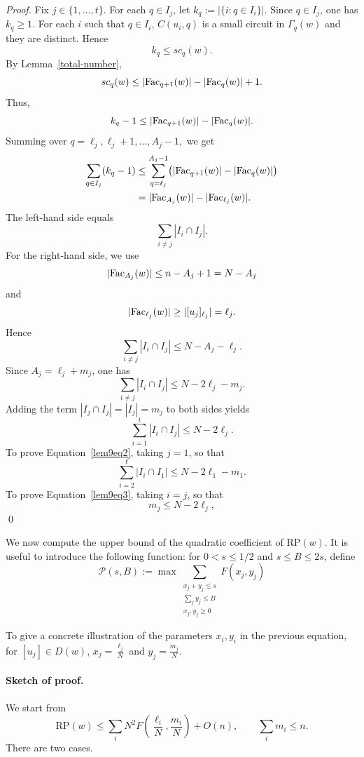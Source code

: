 \documentclass[runningheads,envcountsame,a4paper]{llncs}
\newcommand{\fac}{\hbox{\rm Fac}}
\newcommand{\rp}{\mathrm{RP}}
\begin{document}
\begin{proof}
Fix \(j\in\{1,\ldots,t\}\).  For each \(q\in I_j\), let
$k_q:=|\{i:q\in I_i\}|.$ Since \(q\in I_j\), one has
\(k_q\ge 1\).
For each $i$ such that $q\in I_i$, $C(u_i,q)$ is a small circuit in $\Gamma_q(w)$ and they are distinct. Hence
\[
        k_q\le sc_q(w).
\]
By Lemma~\ref{total-number},
\[
        sc_q(w)\le |\fac_{q+1}(w)|-|\fac_q(w)|+1.
\]
Thus,
\[
        k_q-1
        \le
        |\fac_{q+1}(w)|-|\fac_q(w)|.
\]
Summing over
\(
        q=\ell_j,\ell_j+1,\ldots,A_j-1,
\) we get
\[
\begin{aligned}
        \sum_{q\in I_j}(k_q-1)
        &\le
        \sum_{q=\ell_j}^{A_j-1}
        \bigl(|\fac_{q+1}(w)|-|\fac_q(w)|\bigr)\\
        &=
        |\fac_{A_j}(w)|-|\fac_{\ell_j}(w)|.
\end{aligned}
\]
The left-hand side equals
\[
        \sum_{i\ne j}|I_i\cap I_j|.
\]
For the right-hand side, we use
\[
        |\fac_{A_j}(w)|\le n-A_j+1=N-A_j
\]
and
\[
        |\fac_{\ell_j}(w)|\ge |[u_j]_{\ell_j}|=\ell_j.
\]
Hence
\[
        \sum_{i\ne j}|I_i\cap I_j|
        \le
        N-A_j-\ell_j.
\]
Since \(A_j=\ell_j+m_j\), one has
\[
        \sum_{i\ne j}|I_i\cap I_j|
        \le
        N-2\ell_j-m_j.
\]
Adding the term \(|I_j\cap I_j|=|I_j|=m_j\) to both sides yields
\[
        \sum_{i=1}^t |I_i\cap I_j|
        \le
        N-2\ell_j.
\]
To prove Equation~\ref{lem9eq2}, taking \(j=1\), so that
\[
        \sum_{i=2}^t |I_i\cap I_1|
        \le
        N-2\ell_1-m_1.
\]
To prove Equation~\ref{lem9eq3}, taking \(i=j\), so that
\[
        m_j\le N-2\ell_j,
\]
\qed
\end{proof}

We now compute the upper bound of the quadratic coefficient of $\rp(w)$. It is useful to introduce the following function: for
\(0<s\le 1/2\) and \(s\le B\le 2s\), define 
$$\mathcal P(s,B):=\max \sum_{\substack{x_j+y_j\le s\\\sum_j y_j\le B\\x_j,y_j\ge 0}} F(x_j,y_j) $$ 

To give a concrete illustration of the parameters $x_i, y_i$ in the previous equation, for $[u_j] \in D(w)$, \(x_j=\frac{\ell_j}{N}\) and  \(y_j=\frac{m_j}{N}\).

\paragraph{Sketch of proof.}
We start from
\[
\rp(w)\le \sum_i N^2F(\frac{\ell_i}{N},\frac{m_i}{N})+O(n),
\qquad
\sum_i m_i\le n.
\]
There are two cases.
\end{document}
